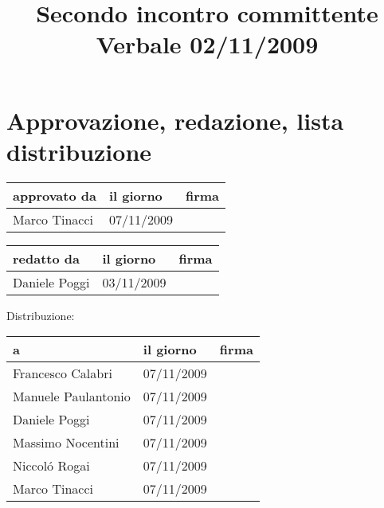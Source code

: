 \documentclass[a4paper, 12pt]{report}
\title{Secondo incontro committente \\Verbale 02/11/2009}
\date{02/11/2009 \\Firenze \\\begin{figure}[h] \centering \texttt{[image: ../../../../images/logokiwi.png]} \end{figure} }
\begin{document}
\maketitle

\newpage

\section*{Approvazione, redazione, lista distribuzione}
\begin{table}[h!]
  \begin{center}
    \begin{tabular}{| l | l | p{60mm} |}
    \hline
    \textbf{approvato da} & \textbf{il giorno} & \textbf{firma} \\
	\hline    
	Marco Tinacci & 07/11/2009 &  \\
    \hline
    \end{tabular}
  \end{center}
\end{table}

\begin{table}[h!]
  \begin{center}
    \begin{tabular}{| l | l | p{60mm} |}
    \hline
    \textbf{redatto da} & \textbf{il giorno} & \textbf{firma} \\
	\hline    
	Daniele Poggi & 03/11/2009 &  \\
    \hline
    \end{tabular}
  \end{center}
\end{table}

Distribuzione:
\begin{table}[h!]
  \begin{center}
    \begin{tabular}{| l | l | p{60mm} |}
    \hline
    \textbf{a} & \textbf{il giorno} & \textbf{firma} \\
	\hline    
	Francesco Calabri & 07/11/2009 &  \\
    \hline
	Manuele Paulantonio & 07/11/2009 &  \\
    \hline
	Daniele Poggi & 07/11/2009 &  \\
    \hline
	Massimo Nocentini & 07/11/2009 &  \\
    \hline
	Niccol\'o Rogai & 07/11/2009 &  \\
    \hline
	Marco Tinacci & 07/11/2009 &  \\
    \hline
    \end{tabular}
  \end{center}
\end{table}

\newpage


\end{document}
